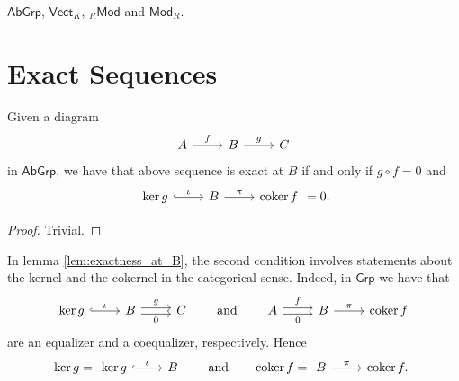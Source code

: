 \begin{examples}
	$\mathsf{AbGrp}$, $\mathsf{Vect}_K$, $_{R}\mathsf{Mod}$ and $\mathsf{Mod}_R$.	
\end{examples}

\section{Exact Sequences}
\begin{lemma}
	\label{lem:exactness_at_B}
	Given a diagram
	\begin{equation*}
		\begin{tikzcd}
			A \arrow[r,"f"] & B \arrow[r,"g"] & C
		\end{tikzcd}
	\end{equation*}
	\noindent in $\mathsf{AbGrp}$, we have that above sequence is exact at $B$ if and only if $g \circ f = 0$ and
	\begin{equation*}
		\begin{tikzcd}
			\ker g \arrow[r,hook,"\iota"] & B \arrow[r,"\pi"] & \coker f 
		\end{tikzcd} = 0.
	\end{equation*}
\end{lemma}

\begin{proof}
	Trivial.
\end{proof}

In lemma \ref{lem:exactness_at_B}, the second condition involves statements about the kernel and the cokernel in the categorical sense. Indeed, in $\mathsf{Grp}$ we have that 
\begin{equation*}
	\begin{tikzcd}
		\ker g \arrow[r,hook,"\iota"] & B \arrow[r, shift left, "g"]\arrow[r,shift right,"0"'] & C
	\end{tikzcd}
	\qquad \text{and} \qquad
	\begin{tikzcd}
		A \arrow[r, shift left, "f"]\arrow[r,shift right,"0"'] & B \arrow[r,"\pi"] & \coker f
	\end{tikzcd}
\end{equation*}
\noindent are an equalizer and a coequalizer, respectively. Hence
\begin{equation*}
	\ker g = \begin{tikzcd}
		\ker g \arrow[r,hook,"\iota"] & B
	\end{tikzcd} \qquad \text{and} \qquad \coker f = \begin{tikzcd}
		B \arrow[r,"\pi"] & \coker f.
	\end{tikzcd}
\end{equation*}

